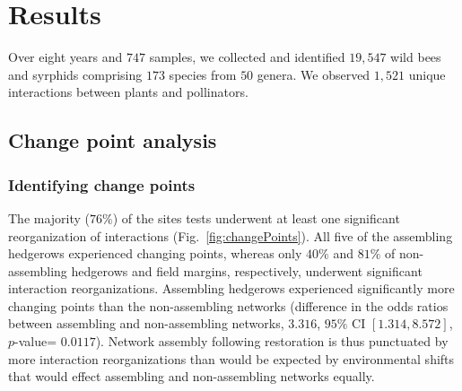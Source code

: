 \documentclass[12pt]{article}
\begin{document}


\section*{Results}
\label{sec:results}

Over eight years and $747$ samples, we collected and identified
$19,547$ wild bees and syrphids comprising $173$ species from $50$
genera. We observed $1,521$ unique interactions between plants and
pollinators.

\subsection*{Change point analysis}
\subsubsection*{Identifying change points}

The majority ($76\%$) of the sites tests underwent at least one
significant reorganization of interactions
(Fig.~\ref{fig:changePoints}).  All five of the assembling hedgerows
experienced changing points, whereas only $40\%$ and $81\%$ of
non-assembling hedgerows and field margins, respectively, underwent
significant interaction reorganizations. Assembling hedgerows
experienced significantly more changing points than the non-assembling
networks (difference in the odds ratios between assembling and
non-assembling networks, $3.316$, $95\%$ CI $[1.314, 8.572]$,
$p$-value= $0.0117$). Network assembly following restoration is thus
punctuated by more interaction reorganizations than would be expected
by environmental shifts that would effect assembling and
non-assembling networks equally.
\end{document}
